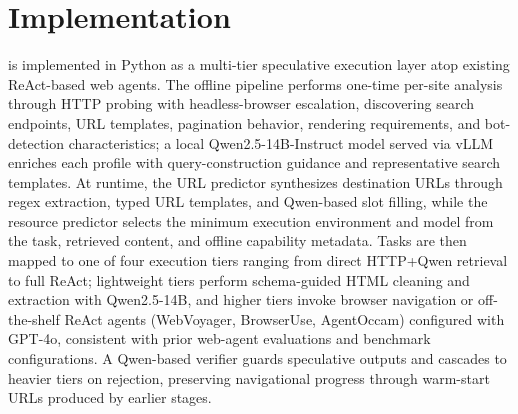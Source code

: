 \section{Implementation}
\sys{} is implemented in Python as a multi-tier speculative
execution layer atop existing ReAct-based web agents. The
offline pipeline performs one-time per-site analysis through
HTTP probing with headless-browser escalation, discovering
search endpoints, URL templates, pagination behavior, rendering
requirements, and bot-detection characteristics; a local
Qwen2.5-14B-Instruct model served via vLLM~\cite{vllm} enriches each profile
with query-construction guidance and representative search
templates. At runtime, the URL predictor synthesizes destination
URLs through regex extraction, typed URL templates, and
Qwen-based slot filling, while the resource predictor selects
the minimum execution environment and model from the task,
retrieved content, and offline capability metadata. Tasks are
then mapped to one of four execution tiers ranging from direct
HTTP+Qwen retrieval to full ReAct; lightweight tiers perform
schema-guided HTML cleaning and extraction with Qwen2.5-14B, and
higher tiers invoke browser navigation or off-the-shelf ReAct
agents (WebVoyager, BrowserUse, AgentOccam) configured with
GPT-4o, consistent with prior web-agent evaluations and benchmark configurations. A Qwen-based verifier guards speculative outputs and
cascades to heavier tiers on rejection, preserving navigational
progress through warm-start URLs produced by earlier stages.
